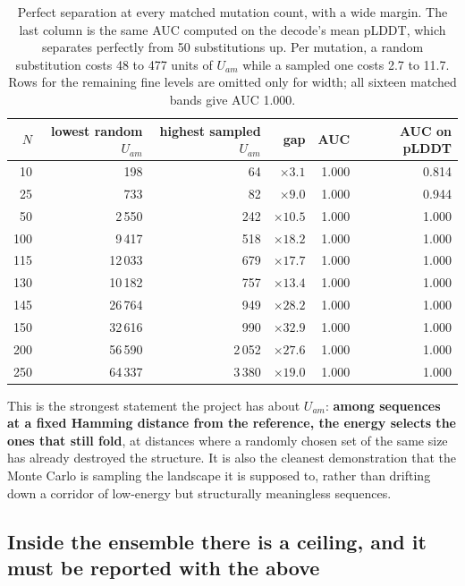 \documentclass[11pt,a4paper]{article}
\begin{document}
\begin{table}[h]
\centering
\begin{tabular}{rrrrrr}
\toprule
$N$ & lowest random $U_{am}$ & highest sampled $U_{am}$ & gap & AUC & AUC on pLDDT \\
\midrule
10  & 198     & 64     & $\times3.1$  & 1.000 & 0.814 \\
25  & 733     & 82     & $\times9.0$  & 1.000 & 0.944 \\
50  & 2\,550   & 242    & $\times10.5$ & 1.000 & 1.000 \\
100 & 9\,417   & 518    & $\times18.2$ & 1.000 & 1.000 \\
115 & 12\,033  & 679    & $\times17.7$ & 1.000 & 1.000 \\
130 & 10\,182  & 757    & $\times13.4$ & 1.000 & 1.000 \\
145 & 26\,764  & 949    & $\times28.2$ & 1.000 & 1.000 \\
150 & 32\,616  & 990    & $\times32.9$ & 1.000 & 1.000 \\
200 & 56\,590  & 2\,052  & $\times27.6$ & 1.000 & 1.000 \\
250 & 64\,337  & 3\,380  & $\times19.0$ & 1.000 & 1.000 \\
\bottomrule
\end{tabular}
\caption{Perfect separation at every matched mutation count, with a wide margin. The last
column is the same AUC computed on the decode's mean pLDDT, which separates perfectly from
50 substitutions up. Per mutation, a random substitution costs 48 to 477 units of $U_{am}$
while a sampled one costs 2.7 to 11.7. Rows for the remaining fine levels are omitted only
for width; all sixteen matched bands give AUC 1.000.}
\end{table}

This is the strongest statement the project has about $U_{am}$: \textbf{among sequences at a
fixed Hamming distance from the reference, the energy selects the ones that still fold}, at
distances where a randomly chosen set of the same size has already destroyed the structure.
It is also the cleanest demonstration that the Monte Carlo is sampling the landscape it is
supposed to, rather than drifting down a corridor of low-energy but structurally
meaningless sequences.

\subsection{Inside the ensemble there is a ceiling, and it must be reported with the above}
\end{document}
